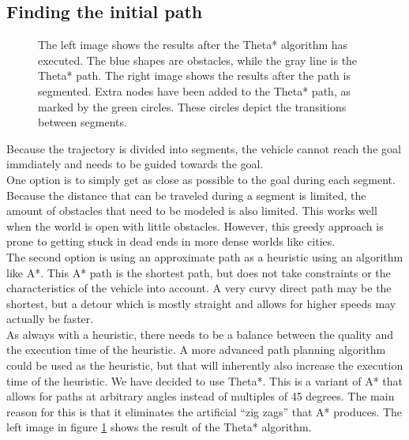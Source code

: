 \subsection{Finding the initial path}
\begin{figure}[!t]
    \centering
    \hfil
    \caption{The left image shows the results after the Theta* algorithm has executed. The blue shapes are obstacles, while the gray line is the Theta* path. The right image shows the results after the path is segmented. Extra nodes have been added to the Theta* path, as marked by the green circles. These circles depict the transitions between segments.}\label{fig:pre-1-2}
\end{figure}
Because the trajectory is divided into segments, the vehicle cannot reach the goal immdiately and needs to be guided towards the goal.\\
One option is to simply get as close as possible to the goal during each segment. Because the distance that can be traveled during a segment is limited, the amount of obstacles that need to be modeled is also limited. This works well when the world is open with little obstacles. However, this greedy approach is prone to getting stuck in dead ends in more dense worlds like cities.
\\
The second option is using an approximate path as a heuristic using an algorithm like A*. This A* path is the shortest path, but does not take constraints or the characteristics of the vehicle into account. A very curvy direct path may be the shortest, but a detour which is mostly straight and allows for higher speeds may actually be faster. 
\\
As always with a heuristic, there needs to be a balance between the quality and the execution time of the heuristic. A more advanced path planning algorithm could be used as the heuristic, but that will inherently also increase the execution time of the heuristic. We have decided to use Theta*. This is a variant  of A* that allows for paths at arbitrary angles instead of multiples of 45 degrees. The main reason for this is that it eliminates the artificial ``zig zags'' that A* produces. The left image in figure \ref{fig:pre-1-2} shows the result of the Theta* algorithm.\\


